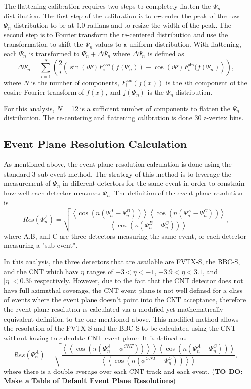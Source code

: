 The flattening calibration requires two steps to completely flatten the $\Psi_n$ distribution. The first step of the calibration is to re-center the peak of the raw $\Psi_n$ distribution to be at 
0.0 radians and to resize the width of the peak. The second step is to Fourier transform the re-centered distribution and use the transformation to shift the $\Psi_n$ values to a uniform distribution. With flattening, each $\Psi_n$ is transformed to $\Psi_n + \Delta\Psi_n$ where $\Delta\Psi_n$ is defined as
\begin{equation}
\Delta\Psi_n = \sum^{N}_{i=1}\left(\frac{2}{i}\left(\sin(i \Psi)F^{\cos}_{i}(f(\Psi_n))-\cos(i \Psi)F^{\sin}_{i}(f(\Psi_n)\right)\right),
\label{eq:deltapsi}
\end{equation}
where $N$ is the number of components, $F^{\cos}_{i}(f(x))$ is the $i$th component of the cosine Fourier transform of $f(x)$, and $f(\Psi_n)$ is the $\Psi_n$ distribution.

For this analysis, $N=$12 is a sufficient number of components to flatten the $\Psi_n$ distribution. The re-centering and flattening calibration is done 30 z-vertex bins.

\subsection{Event Plane Resolution Calculation}
As mentioned above, the event plane resolution calculation is done using the standard 3-sub event method. The strategy of this method is to leverage the measurement of $\Psi_n$ in
different detectors for the same event in order to constrain how well each detector measures $\Psi_n$. The definition of the event plane resolution is
\begin{equation}
Res(\Psi_n^A) = \sqrt{\frac{\left<\cos(n(\Psi_n^A - \Psi_n^B))\right>\left<\cos(n(\Psi_n^A - \Psi_n^C))\right>}{\left<\cos(n(\Psi_n^B - \Psi_n^C))\right>}},
\end{equation}
where A,B, and C are three detectors measuring the same event, or each detector measuring a "sub event".

In this analysis, the three detectors that are available are FVTX-S, the BBC-S, and the CNT which have $\eta$ ranges of $-3 <\eta < -1$, $-3.9 < \eta < 3.1$, and $|\eta| < 0.35$ respectively.
However, due to the fact that the CNT detector does not have full azimuthal coverage, the CNT event plane is not well defined for a class of events where the event plane doesn't point into the CNT acceptance, therefore the event plane resolution is calculated via a modified yet mathematically equivalent definition to the one mentioned above. This modified method allows the resolution of the FVTX-S and the BBC-S to be calculated using the CNT without having to calculate CNT event plane. It is defined as
\begin{equation}
Res(\Psi_n^A) = \sqrt{\frac{\left<\left<\cos(n(\Psi_n^A - \phi^{CNT}))\right>\right>\left<\cos(n(\Psi_n^A - \Psi_n^C))\right>}{\left<\left<\cos(n(\phi^{CNT} - \Psi_n^C))\right>\right>}},
\end{equation}
where there is a double average over each CNT track and each event.
(\textbf{TO DO: Make a Table of Default Event Plane Resolutions})

